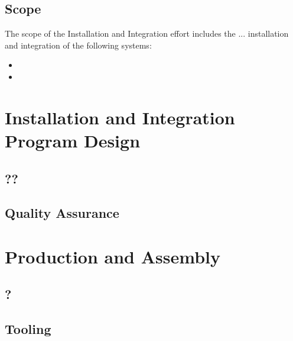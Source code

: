 \subsection{Scope}
\label{sec:fddp-install-scope}

The scope of the Installation and Integration effort includes the ...  installation and integration of the following systems: 


\begin{itemize}
\item  
\item 
\end{itemize}



\section{Installation and Integration Program Design}
\label{sec:fddp-install-design}


\subsection{??}
\label{sec:fddp-install-??}

\subsection{Quality Assurance}
\label{sec:fddp-install-qa}




\section{Production and Assembly}
\label{sec:fddp-install-prod-assy}

\subsection{?}
\label{sec:fddp-install-?}



\subsection{Tooling}
\label{sec:fddp-install-tooling}


